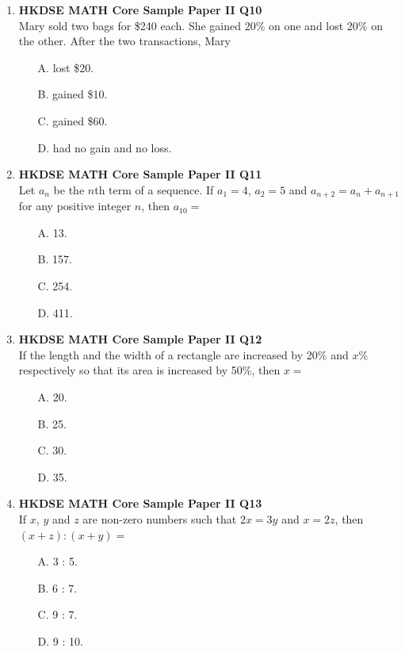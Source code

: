 \documentclass[12pt]{article}
\begin{document}
\begin{enumerate}
	\item \textbf{HKDSE MATH Core Sample Paper II Q10}\\
	Mary sold two bags for \$240 each. She gained 20\% on one and lost 20\% on the other. After the two transactions, Mary
	\begin{enumerate}
		\item[A.] lost \$20.
		\item[B.] gained \$10.
		\item[C.] gained \$60.
		\item[D.] had no gain and no loss.
	\end{enumerate}

	\item \textbf{HKDSE MATH Core Sample Paper II Q11}\\
	Let $a_n$ be the $n$th term of a sequence. If $a_1 = 4$, $a_2 = 5$ and $a_{n + 2} = a_n + a_{n + 1}$ for any positive integer $n$, then $a_{10} = $
	\begin{enumerate}
		\item[A.] 13.
		\item[B.] 157.
		\item[C.] 254.
		\item[D.] 411.
	\end{enumerate}

	\item \textbf{HKDSE MATH Core Sample Paper II Q12}\\
	If the length and the width of a rectangle are increased by 20\% and $x\%$ respectively so that its area is increased by 50\%, then $x = $
	\begin{enumerate}
		\item[A.] 20.
		\item[B.] 25.
		\item[C.] 30.
		\item[D.] 35.
	\end{enumerate}

	\item \textbf{HKDSE MATH Core Sample Paper II Q13}\\
	If $x$, $y$ and $z$ are non-zero numbers such that $2x = 3y$ and $x = 2z$, then $(x + z) : (x + y) = $
	\begin{enumerate}
		\item[A.] 3 : 5.
		\item[B.] 6 : 7.
		\item[C.] 9 : 7.
		\item[D.] 9 : 10.
	\end{enumerate}


\end{enumerate}
\end{document}
